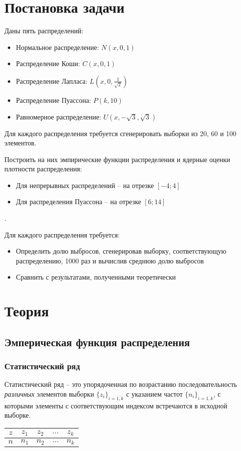 \section{Постановка задачи}
Даны пять распределений:
\begin{itemize}
\item Нормальное распределение: $N(x, 0, 1)$
\item Распределение Коши: $C(x, 0, 1)$
\item Распределение Лапласа: $L(x, 0, \frac{1}{\sqrt{2}})$
\item Распределение Пуассона: $P(k, 10)$
\item Равномерное распределение: $U(x, -\sqrt{3}, \sqrt{3})$
\end{itemize}

Для каждого распределения требуется сгенерировать выборки из 20, 60 и 100 элементов.

Построить на них эмпирические функции распределения и ядерные оценки плотности распределения:
\begin{itemize}
	\item Для непрерывных распределений -- на отрезке $[-4; 4]$
	\item Для распределения Пуассона -- на отрезке $[6; 14]$
\end{itemize} .

Для каждого распределения требуется:
\begin{itemize}
	\item Определить долю выбросов, сгенерировав выборку, соответствующую распределению, 1000 раз и вычислив среднюю долю выбросов
	\item Сравнить с результатами, полученными теоретически
\end{itemize}

\section{Теория}

\subsection{Эмперическая функция распределения}
\subsubsection{Статистический ряд}	Статистический ряд -- это упорядоченная по возрастанию последовательность \textit{различных} элементов выборки $\{z_i\}_{i = \overline{1,k}}$ с  указанием частот $\{n_i\}_{i = \overline{1,k}}$, с которыми элементы с соответствующим индексом встречаются в исходной выборке.
\begin{tabular}{|c|c|c|c|c|}
	\hline
	$z$ & $z_1$ & $z_2$ & $\ldots$ & $z_k$ \\
	\hline
	$n$ & $n_1$ & $n_2$ & $\ldots$ & $n_k$ \\
	\hline
\end{tabular}

